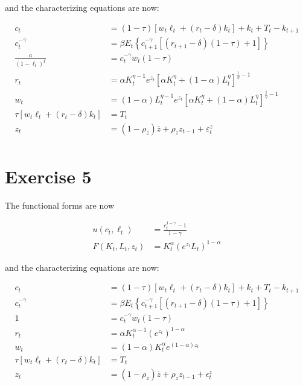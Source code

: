 \documentclass[11pt]{article}
\numberwithin{equation}{section}
\theoremstyle{plain}
\theoremstyle{definition}
\newcommand\parens[1]{\left( #1 \right)}
\newcommand{\1}{\mathbbm 1}
\def\a{\alpha}
\def\g{\gamma}
\newcommand{\e}{\varepsilon}
\begin{document}
and the characterizing equations are now:

\begin{align}
c_{t}&=(1-\tau)\left[w_{t} \ell_{t}+\left(r_{t}-\delta\right) k_{t}\right]+k_{t}+T_{t}-k_{t+1} \\
c_t^{-\g}&=\beta E_{t}\left\{c_{t+1}^{-\g}\left[\left(r_{t+1}-\delta\right)(1-\tau)+1\right]\right\} \\
\frac{a}{(1-\ell_t)^{\xi}}&=c_t^{-\g} w_{t}(1-\tau) \\
r_{t}&=\a K_{t}^{\eta - 1} e^{z_{t}} \left[\alpha K_{t}^{\eta}+(1-\alpha) L_{t}^{\eta}\right]^{\frac{1}{\eta} - 1} \\
w_{t}&=(1-\a) L_{t}^{\eta - 1} e^{z_{t}} \left[\alpha K_{t}^{\eta}+(1-\alpha) L_{t}^{\eta}\right]^{\frac{1}{\eta} - 1} \\
\tau\left[w_{t} \ell_{t}+\left(r_{t}-\delta\right) k_{t}\right]&=T_{t}\\
z_t&= (1 - \rho_z) \overline{z} + \rho_z z_{t-1} + \e_t^{z}\\
\end{align}


\section*{Exercise 5}
The functional forms are now 

\begin{align} 
 u\left(c_{t}, \ell_{t}\right) &=\frac{c_{t}^{1-\gamma}-1}{1-\gamma} \\ 
 F\left(K_{t}, L_{t}, z_{t}\right) &= K_{t}^{\alpha} \parens{e^{z_{t}} L_{t}}^{1-\alpha} 
 \end{align}

and the characterizing equations are now:

\begin{align}
c_{t}&=(1-\tau)\left[w_{t} \ell_{t}+\left(r_{t}-\delta\right) k_{t}\right]+k_{t}+T_{t}-k_{t+1} \\
c_t^{-\g}&=\beta E_{t}\left\{c_{t+1}^{-\g}\left[\left(r_{t+1}-\delta\right)(1-\tau)+1\right]\right\} \\
1&=c_t^{-\g} w_{t}(1-\tau) \\
r_{t}&=\a K_{t}^{\alpha - 1} \parens{e^{z_{t}}}^{1-\alpha} \\
w_{t}&=(1-\a)K_{t}^{\alpha} e^{(1- \alpha) z_{t}} \\
\tau\left[w_{t} \ell_{t}+\left(r_{t}-\delta\right) k_{t}\right]&=T_t \\
z_{t}&=\left(1-\rho_{z}\right) \overline{z}+\rho_{z} z_{t-1}+
\epsilon_{t}^{z}\\
\end{align}
\end{document}
